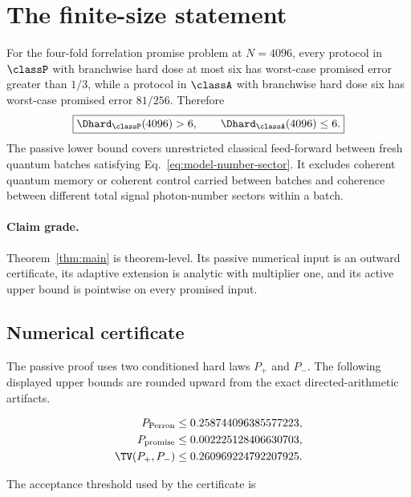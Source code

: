 \section{The finite-size statement}
\label{sec:statement}

\begin{theorem}
\label{thm:main}
For the four-fold forrelation promise problem at $N=4096$, every protocol in $\classP$ with branchwise hard dose at most six has worst-case promised error greater than $1/3$, while a protocol in $\classA$ with branchwise hard dose six has worst-case promised error $81/256$. Therefore
\begin{equation}
\boxed{
\Dhard_{\classP}(4096)>6,
\qquad
\Dhard_{\classA}(4096)\le6.}
\end{equation}
The passive lower bound covers unrestricted classical feed-forward between fresh quantum batches satisfying Eq.~\eqref{eq:model-number-sector}. It excludes coherent quantum memory or coherent control carried between batches and coherence between different total signal photon-number sectors within a batch.
\end{theorem}

\paragraph{Claim grade.} Theorem~\ref{thm:main} is theorem-level. Its passive numerical input is an outward certificate, its adaptive extension is analytic with multiplier one, and its active upper bound is pointwise on every promised input.

\subsection{Numerical certificate}

The passive proof uses two conditioned hard laws $P_+$ and $P_-$. The following displayed upper bounds are rounded upward from the exact directed-arithmetic artifacts.

\begin{align}
P_{\mathrm{Perron}}
&\le 0.258744096385577223,
\\
P_{\mathrm{promise}}
&\le 0.002225128406630703,
\\
\TV(P_+,P_-)
&\le 0.260969224792207925.
\label{eq:statement-total}
\end{align}

The acceptance threshold used by the certificate is

